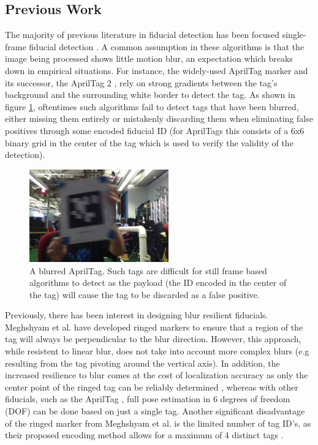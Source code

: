 \documentclass[letterpaper, 10 pt, conference]{ieeeconf}
\begin{document}
\subsection{Previous Work}

 The majority of previous literature in fiducial detection has been focused single-frame fiducial detection \cite{RUNETag, BlurResilient, AprilTag}. A common assumption in these algorithms is that the image being processed shows little motion blur, an expectation which breaks down in empirical situations. For instance, the widely-used AprilTag marker \cite{AprilTag} and its successor, the AprilTag 2 \cite{AprilTag_2}, rely on strong gradients between the tag's background and the surrounding white border to detect the tag. As shown in figure \ref{fig:blurred_tag}, oftentimes such algorithms fail to detect tags that have been blurred, either missing them entirely or mistakenly discarding them when eliminating false positives through some encoded fiducial ID (for AprilTags this consists of a 6x6 binary grid in the center of the tag which is used to verify the validity of the detection).

\begin{figure}[b]
	\centering
	\includegraphics[width=6cm, height=4cm]{blurred_tag}
	\caption{A blurred AprilTag. Such tags are difficult for still frame based algorithms to detect as the payload (the ID encoded in the center of the tag) will cause the tag to be discarded as a false positive.}
	\label{fig:blurred_tag}
\end{figure}

Previously, there has been interest in designing blur resilient fiducials. Meghshyam et al. \cite{BlurResilient} have developed ringed markers to ensure that a region of the tag will always be perpendicular to the blur direction. However, this approach, while resistent to linear blur, does not take into account more complex blurs (e.g resulting from the tag pivoting around the vertical axis). In addition, the increased resilience to blur comes at the cost of localization accuracy as only the center point of the ringed tag can be reliably determined \cite{BlurResilient}, whereas with other fiducials, such as the AprilTag \cite{AprilTag}, full pose estimation in 6 degrees of freedom (DOF) can be done based on just a single tag. Another significant disadvantage of the ringed marker from Meghshyam et al. is the limited number of tag ID's, as their proposed encoding method allows for a maximum of 4 distinct tags \cite{BlurResilient}.
\end{document}
